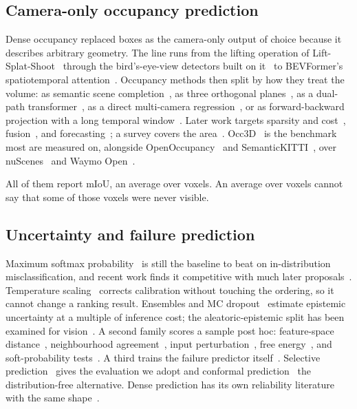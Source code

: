 \documentclass[10pt,twocolumn,letterpaper]{article}
\begin{document}
\subsection{Camera-only occupancy prediction}
Dense occupancy replaced boxes as the camera-only output of choice because
it describes arbitrary geometry. The line runs from the lifting operation
of Lift-Splat-Shoot~\cite{philion2020lss} through the bird's-eye-view
detectors built on it~\cite{huang2021bevdet, li2023bevdepth,
chambon2024pointbev, harley2023simplebev} to BEVFormer's spatiotemporal
attention~\cite{li2022bevformer}. Occupancy methods then split by how they
treat the volume: as semantic scene completion~\cite{cao2022monoscene,
li2023voxformer}, as three orthogonal planes~\cite{huang2023tpvformer}, as
a dual-path transformer~\cite{zhang2023occformer}, as a direct multi-camera
regression~\cite{wei2023surroundocc}, or as forward-backward projection
with a long temporal window~\cite{li2023fbocc}. Later work targets sparsity
and cost~\cite{liu2023sparseocc, lightocc2024, zheng2024monoocc,
kim2025protoocc}, fusion~\cite{li2024gafusion}, and
forecasting~\cite{wang2024occworld, occworldsemi2025}; a survey
covers the area~\cite{occsurvey2024}. Occ3D~\cite{tian2023occ3d} is the
benchmark most are measured on, alongside
OpenOccupancy~\cite{wang2023openoccupancy} and
SemanticKITTI~\cite{behley2019semantickitti}, over
nuScenes~\cite{caesar2020nuscenes} and Waymo Open~\cite{sun2020waymo}.

All of them report mIoU, an average over voxels. An average over voxels
cannot say that some of those voxels were never visible.

\subsection{Uncertainty and failure prediction}
Maximum softmax probability~\cite{hendrycks2017msp} is still the baseline
to beat on in-distribution misclassification, and recent work finds it
competitive with much later proposals~\cite{zhu2024revisiting}. Temperature
scaling~\cite{guo2017calibration} corrects calibration without touching the
ordering, so it cannot change a ranking result. Ensembles and MC
dropout~\cite{lakshminarayanan2017ensembles, gal2016dropout} estimate
epistemic uncertainty at a multiple of inference cost; the
aleatoric-epistemic split has been examined for
vision~\cite{kendall2017uncertainties}. A second family scores a sample
post hoc: feature-space distance~\cite{lee2018mahalanobis}, neighbourhood
agreement~\cite{jiang2018trust}, input perturbation~\cite{liang2018odin},
free energy~\cite{liu2020energy}, and soft-probability
tests~\cite{granese2021doctor}. A third trains the failure predictor
itself~\cite{corbiere2019confidnet, geifman2019selectivenet}. Selective
prediction~\cite{geifman2017selective} gives the evaluation we adopt and
conformal prediction~\cite{angelopoulos2021conformal} the
distribution-free alternative. Dense prediction has its own reliability
literature with the same shape~\cite{derooij2023segreliability,
dreissig2023lidarcalib, blum2019fishyscapes}.
\end{document}
